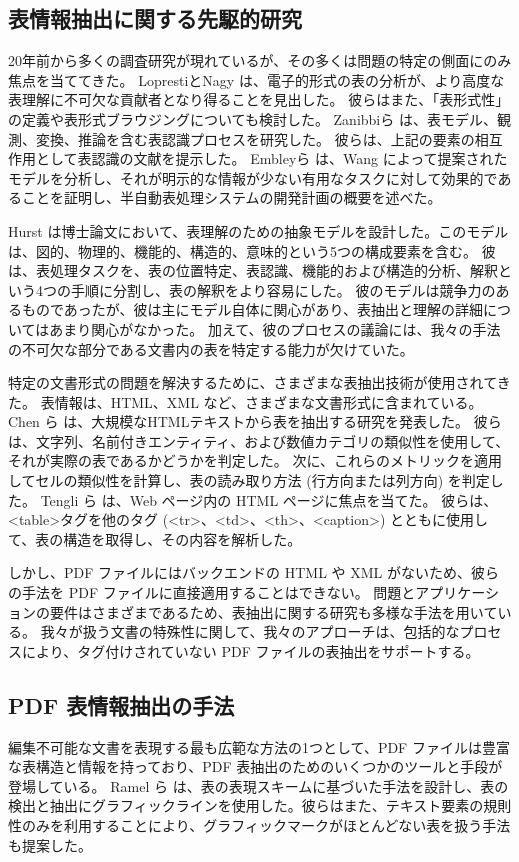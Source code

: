 \documentclass[uplatex, twocolumn,10pt]{jsarticle}
\begin{document}
\subsection{表情報抽出に関する先駆的研究}
20年前から多くの調査研究が現れているが、その多くは問題の特定の側面にのみ焦点を当ててきた。
LoprestiとNagy \cite{bib03} は、電子的形式の表の分析が、より高度な表理解に不可欠な貢献者となり得ることを見出した。
彼らはまた、「表形式性」の定義や表形式ブラウジングについても検討した。
Zanibbiら \cite{bib04} は、表モデル、観測、変換、推論を含む表認識プロセスを研究した。
彼らは、上記の要素の相互作用として表認識の文献を提示した。
Embleyら \cite{bib05} は、Wang \cite{bib06} によって提案されたモデルを分析し、それが明示的な情報が少ない有用なタスクに対して効果的であることを証明し、半自動表処理システムの開発計画の概要を述べた。

Hurst \cite{bib07} は博士論文において、表理解のための抽象モデルを設計した。このモデルは、図的、物理的、機能的、構造的、意味的という5つの構成要素を含む。
彼 \cite{bib08} は、表処理タスクを、表の位置特定、表認識、機能的および構造的分析、解釈という4つの手順に分割し、表の解釈をより容易にした。
彼のモデルは競争力のあるものであったが、彼は主にモデル自体に関心があり、表抽出と理解の詳細についてはあまり関心がなかった。
加えて、彼のプロセスの議論には、我々の手法の不可欠な部分である文書内の表を特定する能力が欠けていた。

特定の文書形式の問題を解決するために、さまざまな表抽出技術が使用されてきた。
表情報は、HTML、XML など、さまざまな文書形式に含まれている。
Chen ら \cite{bib09} は、大規模なHTMLテキストから表を抽出する研究を発表した。
彼らは、文字列、名前付きエンティティ、および数値カテゴリの類似性を使用して、それが実際の表であるかどうかを判定した。
次に、これらのメトリックを適用してセルの類似性を計算し、表の読み取り方法 (行方向または列方向) を判定した。
Tengli ら \cite{bib10} は、Web ページ内の HTML ページに焦点を当てた。
彼らは、<table>タグを他のタグ (<tr>、<td>、<th>、<caption>) とともに使用して、表の構造を取得し、その内容を解析した。

しかし、PDF ファイルにはバックエンドの HTML や XML がないため、彼らの手法を PDF ファイルに直接適用することはできない。
問題とアプリケーションの要件はさまざまであるため、表抽出に関する研究も多様な手法を用いている。
我々が扱う文書の特殊性に関して、我々のアプローチは、包括的なプロセスにより、タグ付けされていない PDF ファイルの表抽出をサポートする。

\subsection{PDF 表情報抽出の手法}
編集不可能な文書を表現する最も広範な方法の1つとして、PDF ファイルは豊富な表構造と情報を持っており、PDF 表抽出のためのいくつかのツールと手段が登場している。
Ramel ら \cite{bib02} は、表の表現スキームに基づいた手法を設計し、表の検出と抽出にグラフィックラインを使用した。彼らはまた、テキスト要素の規則性のみを利用することにより、グラフィックマークがほとんどない表を扱う手法も提案した。
\end{document}
